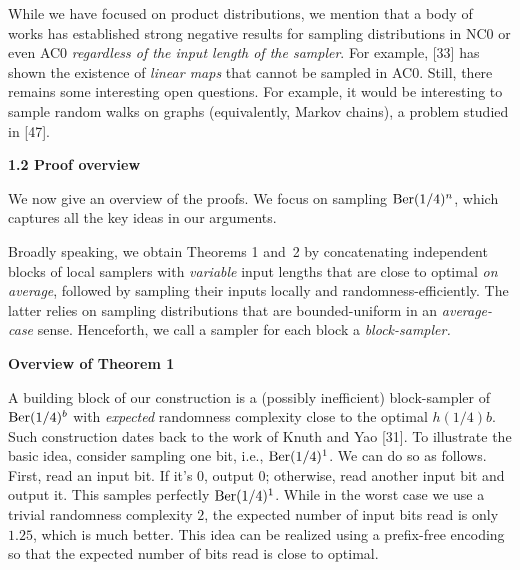 \documentclass[10pt,a4paper]{article}
\begin{document}
While we have focused on product distributions, we mention that a body of works has established strong negative results for sampling distributions in NC0 or even AC0 \emph{regardless of the input length of the sampler}. For example, [33] has shown the existence of \emph{linear maps} that cannot be sampled in AC0. Still, there remains some interesting open questions. For example, it would be interesting to sample random walks on graphs (equivalently, Markov chains), a problem studied in [47].\par





\par\medskip\noindent\textbf{
1.2 Proof overview}\par




We now give an overview of the proofs. We focus on sampling $\textnormal{Ber}(1/4)^{n}$, which captures all the key ideas in our arguments.\par




Broadly speaking, we obtain Theorems 1 and 2 by concatenating independent blocks of local samplers with \emph{variable} input lengths that are close to optimal \emph{on average}, followed by sampling their inputs locally and randomness-efficiently.
The latter relies on sampling distributions that are bounded-uniform in an \emph{average-case} sense.
Henceforth, we call a sampler for each block a \emph{block-sampler.}\par




\par\medskip\noindent\textbf{Overview of Theorem 1
}\par




A building block of our construction is a (possibly inefficient) block-sampler of $\textnormal{Ber}(1/4)^{b}$ with \emph{expected} randomness complexity close to the optimal $h(1/4)b$.
Such construction dates back to the work of Knuth and Yao [31].
To illustrate the basic idea, consider sampling one bit, i.e., $\textnormal{Ber}(1/4)^{1}$. We can do so as follows. First, read an input bit. If it’s 0, output $0$; otherwise, read another input bit and output it. This samples perfectly $\textnormal{Ber}(1/4)^{1}$. While in the worst case we use a trivial randomness complexity $2$, the expected number of input bits read is only $1.25$, which is much better. This idea can be realized using a prefix-free encoding so that the expected number of bits read is close to optimal.\par
\end{document}
